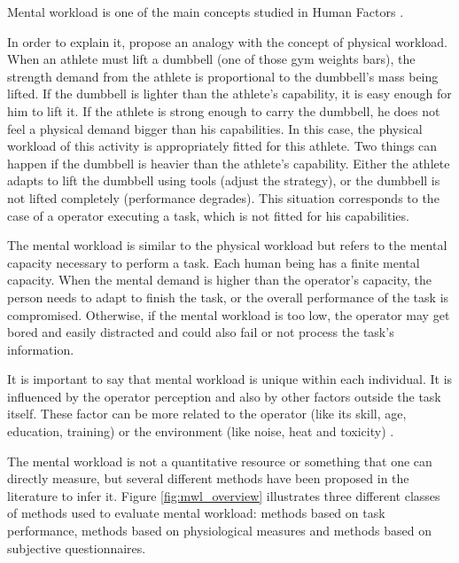 Mental workload is one of the main concepts studied in Human Factors \cite{stanton2004handbook}.

In order to explain it,  propose an analogy with the concept of physical workload. When an athlete must lift a dumbbell (one of those gym weights bars), the strength demand from the athlete is proportional to the dumbbell's mass being lifted. If the dumbbell is lighter than the athlete's capability, it is easy enough for him to lift it. If the athlete is strong enough to carry the dumbbell, he does not feel a physical demand bigger than his capabilities. In this case, the physical workload of this activity is appropriately fitted for this athlete. Two things can happen if the dumbbell is heavier than the athlete's capability. Either the athlete adapts to lift the dumbbell using tools (adjust the strategy), or the dumbbell is not lifted completely (performance degrades). This situation corresponds to the case of a operator executing a task, which is not fitted for his capabilities.

The mental workload is similar to the physical workload but refers to the mental capacity necessary to perform a task. Each human being has a finite mental capacity. When the mental demand is higher than the operator's capacity, the person needs to adapt to finish the task, or the overall performance of the task is compromised. Otherwise, if the mental workload is too low, the operator may get bored and easily distracted and could also fail or not process the task's information.

It is important to say that mental workload is unique within each individual. It is influenced by the operator perception and also by other factors outside the task itself. These factor can be more related to the operator (like its skill, age, education, training) or the environment (like noise, heat and toxicity)  \cite{cain2007review, fallahi2016effects, cardoso2012evaluation}.

The mental workload is not a quantitative resource or something that one can directly measure, but several different methods have been proposed in the literature to infer it. Figure \ref{fig:mwl_overview} illustrates three different classes of methods used to evaluate mental workload: methods based on task performance, methods based on physiological measures and methods based on subjective questionnaires.
        
        
    
